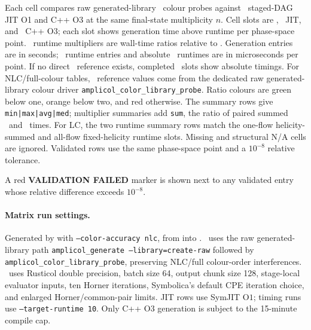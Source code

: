 \noindent\footnotesize Each cell compares raw generated-library \AC\ colour probes against \PAC\ staged-DAG JIT O1 and C++ O3 at the same final-state multiplicity \(n\).  Cell slots are \AC, \PAC\ JIT, and \PAC\ C++ O3; each slot shows generation time above runtime per phase-space point.  \PAC\ runtime multipliers are wall-time ratios relative to \AC.  Generation entries are in seconds; \AC\ runtime entries and absolute \PAC\ runtimes are in microseconds per point. If no direct \AC\ reference exists, completed \PAC\ slots show absolute timings. For NLC/full-colour tables, \AC\ reference values come from the dedicated raw generated-library colour driver \texttt{amplicol\_color\_library\_probe}. Ratio colours are green below one, orange below two, and red otherwise.  The summary rows give \texttt{min|max|avg|med}; multiplier summaries add \texttt{sum}, the ratio of paired summed \PAC\ and \AC\ times.  For LC, the two runtime summary rows match the one-flow helicity-summed and all-flow fixed-helicity runtime slots.  Missing and structural N/A cells are ignored.  Validated rows use the same phase-space point and a \(10^{-8}\) relative tolerance.
\par\smallskip
\noindent\footnotesize A red \textbf{VALIDATION FAILED} marker is shown next to any validated entry whose relative difference exceeds \(10^{-8}\).
\par\smallskip
\paragraph{Matrix run settings.}
\noindent\footnotesize Generated by  with \texttt{--color-accuracy nlc}, from  into . \AC\ uses the raw generated-library path \texttt{amplicol\_generate --library=create-raw} followed by \texttt{amplicol\_color\_library\_probe}, preserving NLC/full colour-order interferences. \PAC\ uses Rusticol double precision, batch size 64, output chunk size 128, stage-local evaluator inputs, ten Horner iterations, Symbolica's default CPE iteration choice, and enlarged Horner/common-pair limits.  JIT rows use SymJIT \(\mathrm{O}1\); timing runs use \texttt{--target-runtime 10}.  Only C++ O3 generation is subject to the 15-minute compile cap.
\par\smallskip